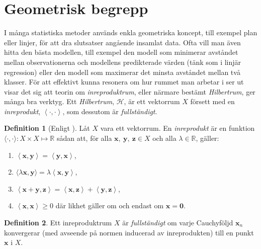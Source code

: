\documentclass[a4paper, 12pt]{report}
\theoremstyle{definition}
\newtheorem{defi}{Definition}[section]
\theoremstyle{remark}
\newcommand{\llangle}{\left\langle}
\newcommand{\rrangle}{\right\rangle}
\newcommand{\inprod}[2]{\llangle \mathbf{#1}, \mathbf{#2}\rrangle}
\begin{document}
\section{Geometrisk begrepp}
I många statistiska metoder används enkla geometriska koncept, till exempel plan eller linjer, för att dra slutsatser angående insamlat data.
Ofta vill man även hitta den bästa modellen, till exempel den modell som minimerar avståndet mellan observationerna och modellens predikterade värden (tänk som i linjär regression) eller den modell som maximerar det minsta avståndet mellan två klasser.
För att effektivt kunna resonera om hur rummet man arbetar i ser ut visar det sig att teorin om \emph{inreproduktrum}, eller närmare bestämt \emph{Hilbertrum}, ger många bra verktyg.
Ett \emph{Hilbertrum}, $\mathcal{H}$, är ett vektorrum $X$ försett med en \emph{inreprodukt}, $\llangle \cdot, \cdot\rrangle$, som dessutom är \emph{fullständigt}.

\begin{defi}[Enligt \cite{Young}]\label{def:inreprodukt}
	Låt $X$ vara ett vektorrum. En \emph{inreprodukt} är en funktion $\langle \cdot , \cdot \rangle: X\times X \longmapsto \mathbb{R}$ sådan att, för alla $\mathbf{x},~\mathbf{y},~\mathbf{z}\in X$ och alla $\lambda \in \mathbb{R}$, gäller:
	\begin{enumerate}[label=\textbf{IP\arabic*}]
		\item \label{IP1} $\inprod{x}{y} = \inprod{y}{x}$,
		\item \label{IP2} $\langle \lambda \mathbf{x}, \mathbf{y}\rangle = \lambda \inprod{x}{y}$,
		\item \label{IP3} $\inprod{x+y}{z} =\inprod{x}{z} + \inprod{y}{z}$,
		\item \label{IP4} $\inprod{x}{x} \geq 0$ där likhet gäller om och endast om $\mathbf{x} = \mathbf{0}$. 
	\end{enumerate}
\end{defi}

\begin{defi}\label{def:Cfull}
	Ett inreproduktrum $X$ är \emph{fullständigt} om varje Cauchyföljd $\mathbf{x}_n$ konvergerar (med avseende på normen inducerad av inreprodukten) till en punkt $\mathbf{x}$ i $X$.
\end{defi}
\end{document}
